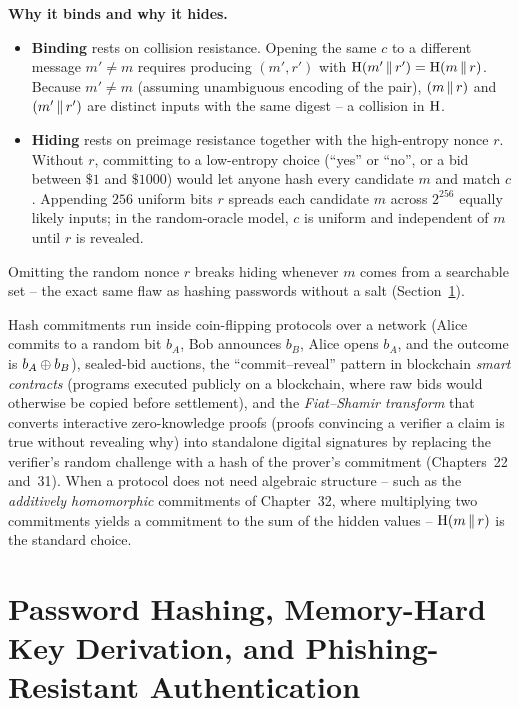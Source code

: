\begin{whybox}
\textbf{Why it binds and why it hides.}
\begin{itemize}
  \item \textbf{Binding} rests on collision resistance. Opening the same $c$ to a different message $m' \ne m$ requires producing $(m', r')$ with $\operatorname{H}(m' \,\|\, r') = \operatorname{H}(m \,\|\, r)$. Because $m' \ne m$ (assuming unambiguous encoding of the pair), $(m \,\|\, r)$ and $(m' \,\|\, r')$ are distinct inputs with the same digest -- a collision in $\operatorname{H}$.
  \item \textbf{Hiding} rests on preimage resistance together with the high-entropy nonce $r$. Without $r$, committing to a low-entropy choice (``yes'' or ``no'', or a bid between $\$1$ and $\$1000$) would let anyone hash every candidate $m$ and match $c$. Appending $256$ uniform bits $r$ spreads each candidate $m$ across $2^{256}$ equally likely inputs; in the random-oracle model, $c$ is uniform and independent of $m$ until $r$ is revealed.
\end{itemize}
Omitting the random nonce $r$ breaks hiding whenever $m$ comes from a searchable set -- the exact same flaw as hashing passwords without a salt (Section~\ref{ch14:passwords}).
\end{whybox}

\begin{applicationbox}
Hash commitments run inside coin-flipping protocols over a network (Alice commits to a random bit $b_A$, Bob announces $b_B$, Alice opens $b_A$, and the outcome is $b_A \oplus b_B$), sealed-bid auctions, the ``commit--reveal'' pattern in blockchain \emph{smart contracts} (programs executed publicly on a blockchain, where raw bids would otherwise be copied before settlement), and the \emph{Fiat--Shamir transform} that converts interactive zero-knowledge proofs (proofs convincing a verifier a claim is true without revealing why) into standalone digital signatures by replacing the verifier's random challenge with a hash of the prover's commitment (Chapters~22 and~31). When a protocol does not need algebraic structure -- such as the \emph{additively homomorphic} commitments of Chapter~32, where multiplying two commitments yields a commitment to the sum of the hidden values -- $\operatorname{H}(m \,\|\, r)$ is the standard choice.
\end{applicationbox}

\section[Password Hashing, Memory-Hard Key Derivation, and Phishing-Resistant Authentication]{Password Hashing, Memory-Hard Key Derivation, \protect\linebreak and Phishing-Resistant Authentication}
\label{ch14:passwords}

